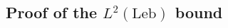 \documentclass[12pt]{amsart}
\newcommand{\R}{\mathbb{R}}
\newcommand*\abs[1]{
	\left|#1\right|
}
\newcommand*\Leb{
	\mathrm{Leb}
}
\theoremstyle{definition}
\begin{document}

\subsection{Proof of the $L^2(\Leb)$ bound}
\end{document}
